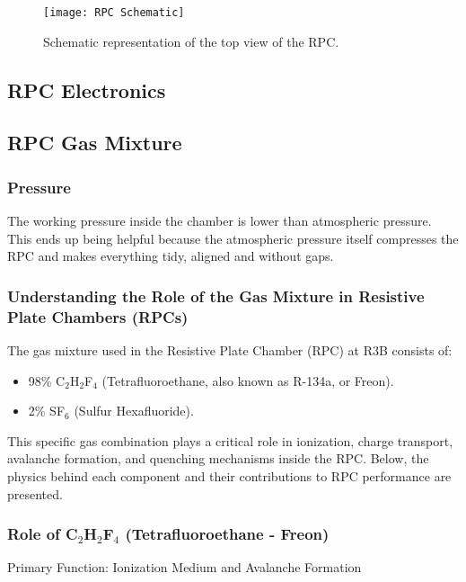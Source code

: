 \begin{figure}
	\texttt{[image: RPC Schematic]}
	\caption{Schematic representation of the top view of the RPC.}
	\label{fig:RPCScheme}
\end{figure}

\subsection{RPC Electronics}

\subsection{RPC Gas Mixture}

\subsubsection{Pressure}

The working pressure inside the chamber is lower than atmospheric pressure. This ends up being helpful because the atmospheric pressure itself compresses the RPC and makes everything tidy, aligned and without gaps.


\subsubsection{Understanding the Role of the Gas Mixture in Resistive Plate Chambers (RPCs)}

The gas mixture used in the Resistive Plate Chamber (RPC) at \gls{R3B} consists of:

\begin{itemize}
	\item 98\% C$_2$H$_2$F$_4$ (Tetrafluoroethane, also known as R-134a, or Freon).
	\item 2\% SF$_6$ (Sulfur Hexafluoride).
\end{itemize}


This specific gas combination plays a critical role in ionization, charge transport, avalanche formation, and quenching mechanisms inside the RPC. Below, the physics behind each component and their contributions to RPC performance are presented.


\subsubsection{Role of C$_2$H$_2$F$_4$ (Tetrafluoroethane - Freon)}

Primary Function: Ionization Medium and Avalanche Formation

